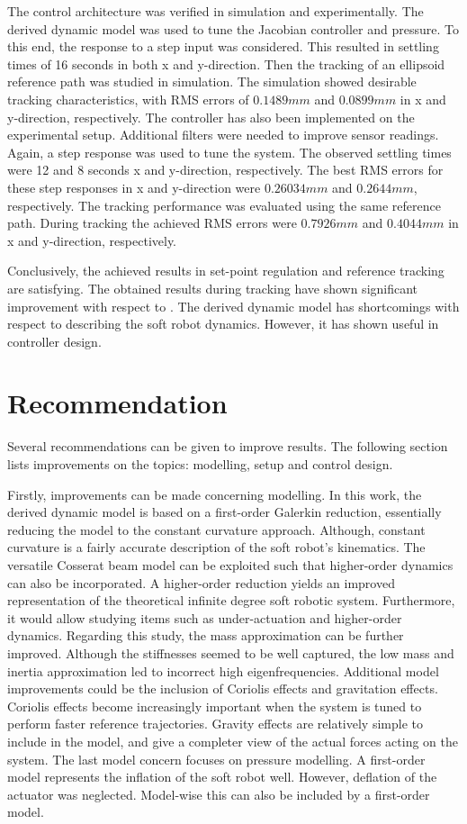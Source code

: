 The control architecture was verified in simulation and experimentally. The derived dynamic model was used to tune the Jacobian controller and pressure. To this end, the response to a step input was considered. This resulted in settling times of 16 seconds in both x and y-direction. Then the tracking of an ellipsoid reference path was studied in simulation. The simulation showed desirable tracking characteristics, with RMS errors of $0.1489 mm$ and $0.0899 mm$ in x and y-direction, respectively. The controller has also been implemented on the experimental setup. Additional filters were needed to improve sensor readings. Again, a step response was used to tune the system. The observed settling times were 12 and 8 seconds x and y-direction, respectively. The best RMS errors for these step responses in x and y-direction were $0.26034mm$ and $0.2644mm$, respectively. The tracking performance was evaluated using the same reference path. During tracking the achieved RMS errors were $0.7926 mm$ and $0.4044 mm$ in x and y-direction, respectively. 

Conclusively, the achieved results in set-point regulation and reference tracking are satisfying. The obtained results during tracking have shown significant improvement with respect to \cite{berkers}. The derived dynamic model has shortcomings with respect to describing the soft robot dynamics. However, it has shown useful in controller design.

\section{Recommendation}

Several recommendations can be given to improve results. The following section lists improvements on the topics: modelling, setup and control design.

Firstly, improvements can be made concerning modelling. In this work, the derived dynamic model is based on a first-order Galerkin reduction, essentially reducing the model to the constant curvature approach. Although, constant curvature is a fairly accurate description of the soft robot's kinematics. The versatile Cosserat beam model can be exploited such that higher-order dynamics can also be incorporated. A higher-order reduction yields an improved representation of the theoretical infinite degree soft robotic system. Furthermore, it would allow studying items such as under-actuation and higher-order dynamics. Regarding this study, the mass approximation can be further improved. Although the stiffnesses seemed to be well captured, the low mass and inertia approximation led to incorrect high eigenfrequencies. Additional model improvements could be the inclusion of Coriolis effects and gravitation effects. Coriolis effects become increasingly important when the system is tuned to perform faster reference trajectories. Gravity effects are relatively simple to include in the model, and give a completer view of the actual forces acting on the system. The last model concern focuses on pressure modelling. A first-order model represents the inflation of the soft robot well. However, deflation of the actuator was neglected. Model-wise this can also be included by a first-order model. 

